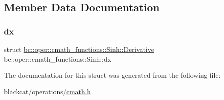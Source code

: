 \subsection{Member Data Documentation}
\mbox{\label{structbc_1_1oper_1_1cmath__functions_1_1Sinh_aeb8f9859983dff6f40fea974293f16e7}} 
\subsubsection{\texorpdfstring{dx}{dx}}
{\footnotesize\ttfamily struct \hyperlink{structbc_1_1oper_1_1cmath__functions_1_1Sinh_1_1Derivative}{bc\+::oper\+::cmath\+\_\+functions\+::\+Sinh\+::\+Derivative}   bc\+::oper\+::cmath\+\_\+functions\+::\+Sinh\+::dx}



The documentation for this struct was generated from the following file\+:\begin{DoxyCompactItemize}
\item 
blackcat/operations/\hyperlink{cmath_8h}{cmath.\+h}\end{DoxyCompactItemize}
